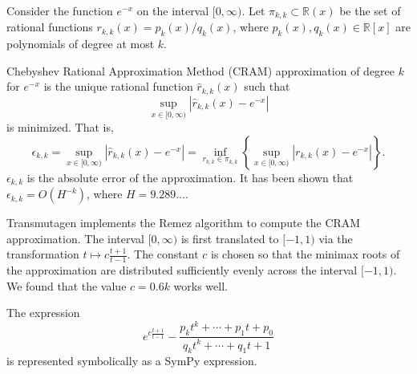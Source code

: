 Consider the function $e^{-x}$ on the interval $[0,\infty)$. Let
$\pi_{k,k}\subset \mathbb{R}(x)$ be the set of rational functions $r_{k,k}(x)
= p_k(x)/q_k(x)$, where $p_k(x), q_k(x)\in \mathbb{R}[x]$ are polynomials of
degree at most $k$.

Chebyshev Rational Approximation Method (CRAM) approximation of degree $k$
for $e^{-x}$ is the unique rational function $\hat{r}_{k,k}(x)$ such that
\begin{equation}
  \sup_{x\in[0, \infty)}|\hat{r}_{k, k}(x) - e^{-x}|
\end{equation}
is minimized. That is,
\begin{equation}
  \epsilon_{k,k} = \sup_{x\in[0, \infty)}|\hat{r}_{k, k}(x) - e^{-x}| = \inf_{r_{k,k}\in\pi_{k,k}}\left\{\sup_{x\in[0, \infty)}|r_{k, k}(x) - e^{-x}|\right\}.
\end{equation}
$\epsilon_{k,k}$ is the absolute error of the approximation. It has been shown
that $\epsilon_{k,k} = O(H^{-k})$, where $H=9.289\ldots$.

Transmutagen implements the Remez algorithm to compute the CRAM approximation.
The interval $[0, \infty)$ is first translated to $[-1, 1)$ via the
transformation $t\mapsto c\frac{t+1}{t-1}$.
The constant $c$ is chosen so that the minimax roots of the approximation are
distributed sufficiently evenly across the interval $[-1, 1)$. We found that
the value $c=0.6k$ works well.

The expression
\begin{equation}
  e^{c\frac{t+1}{t-1}} - \frac{p_kt^k + \cdots + p_1t + p_0}{q_kt^k + \cdots +
    q_1t + 1}
\end{equation}
is represented symbolically as a SymPy expression.
